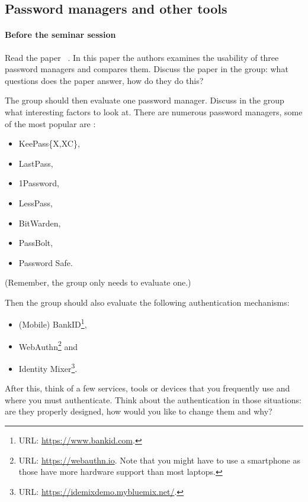 \subsection{Password managers and other tools}%
\label{password-managers-tools}

\paragraph{Before the seminar session}

Read the paper 
~\cite{UsabilityEvaluationOfPasswordManagers}.
In this paper the authors examines the usability of three password managers and 
compares them.
Discuss the paper in the group: what questions does the paper answer, how do 
they do this?

The group should then evaluate one password manager.
Discuss in the group what interesting factors to look at.
There are numerous password managers, some of the most popular are \eg:
\begin{itemize}
  \item KeePass\{X,XC\},
  \item LastPass,
  \item 1Password,
  \item LessPass,
  \item BitWarden,
  \item PassBolt,
  \item Password Safe.
\end{itemize}
(Remember, the group only needs to evaluate one.)

Then the group should also evaluate the following authentication mechanisms:
\begin{itemize}
  \item (Mobile) BankID\footnote{%
      URL: \url{https://www.bankid.com}.
    },
  \item WebAuthn\footnote{%
      URL: \url{https://webauthn.io}.
      Note that you might have to use a smartphone as those have more hardware 
      support than most laptops.
    } and
  \item Identity Mixer\footnote{%
      URL: \url{https://idemixdemo.mybluemix.net/}.
    }.
\end{itemize}

After this, think of a few services, tools or devices that you frequently use 
and where you must authenticate.
Think about the authentication in those situations: are they properly designed, 
how would you like to change them and why?

